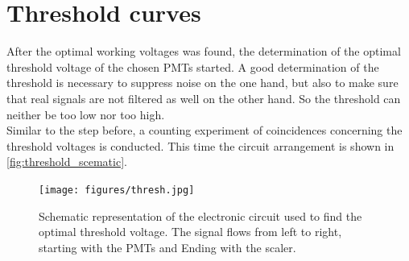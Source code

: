\section{Threshold curves}
After the optimal working voltages was found, the determination of the optimal threshold voltage of the chosen PMTs started.
A good determination of the threshold is necessary to suppress noise on the one hand, but also to make sure that real signals are not
filtered as well on the other hand. So the threshold can neither be too low nor too high.\\

Similar to the step before, a counting experiment of coincidences concerning the threshold voltages is conducted. This time the circuit arrangement is shown in 
\autoref{fig:threshold_scematic}.
\begin{figure}
   \centering
   \texttt{[image: figures/thresh.jpg]}
   \caption{Schematic representation of the electronic circuit used to find the optimal threshold voltage.
   The signal flows from left to right, starting with the PMTs and Ending with the scaler.}
   \label{fig:threshold_scematic}
\end{figure}

